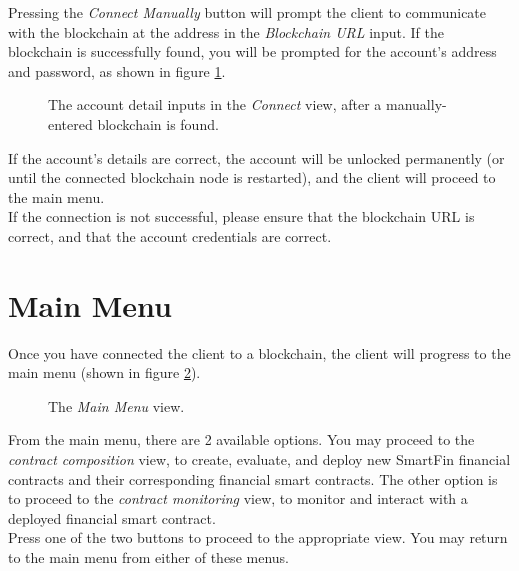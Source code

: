 \documentclass{article}
\begin{document}
Pressing the \textit{Connect Manually} button will prompt the client to communicate with the blockchain at the address in the \textit{Blockchain URL} input. If the blockchain is successfully found, you will be prompted for the account's address and password, as shown in figure \ref{UG:fig:connect-account}.

\begin{figure}[h]
    \centering
    \caption{The account detail inputs in the \textit{Connect} view, after a manually-entered blockchain is found.}
    \label{UG:fig:connect-account}
\end{figure}

If the account's details are correct, the account will be unlocked permanently (or until the connected blockchain node is restarted), and the client will proceed to the main menu. \\

If the connection is not successful, please ensure that the blockchain URL is correct, and that the account credentials are correct.


\section{Main Menu}

Once you have connected the client to a blockchain, the client will progress to the main menu (shown in figure \ref{UG:fig:main-menu}).

\begin{figure}[h]
    \centering
    \caption{The \textit{Main Menu} view.}
    \label{UG:fig:main-menu}
\end{figure}

From the main menu, there are 2 available options. You may proceed to the \textit{contract composition} view, to create, evaluate, and deploy new SmartFin financial contracts and their corresponding financial smart contracts. The other option is to proceed to the \textit{contract monitoring} view, to monitor and interact with a deployed financial smart contract. \\

Press one of the two buttons to proceed to the appropriate view. You may return to the main menu from either of these menus.
\end{document}
